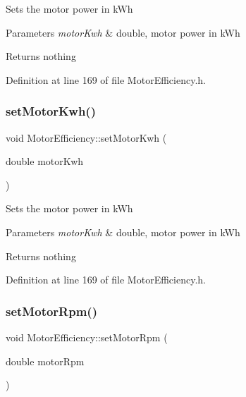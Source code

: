 Sets the motor power in k\+Wh


\begin{DoxyParams}{Parameters}
{\em motor\+Kwh} & double, motor power in k\+Wh\\
\hline
\end{DoxyParams}
\begin{DoxyReturn}{Returns}
nothing 
\end{DoxyReturn}


Definition at line 169 of file Motor\+Efficiency.\+h.

\mbox{\label{class_motor_efficiency_ab1c7507bac259565e43a6777d079148b}} 
\subsubsection{\texorpdfstring{set\+Motor\+Kwh()}{setMotorKwh()}\hspace{0.1cm}{\footnotesize\ttfamily [3/3]}}
{\footnotesize\ttfamily void Motor\+Efficiency\+::set\+Motor\+Kwh (\begin{DoxyParamCaption}\item[{double}]{motor\+Kwh }\end{DoxyParamCaption})\hspace{0.3cm}{\ttfamily [inline]}}

Sets the motor power in k\+Wh


\begin{DoxyParams}{Parameters}
{\em motor\+Kwh} & double, motor power in k\+Wh\\
\hline
\end{DoxyParams}
\begin{DoxyReturn}{Returns}
nothing 
\end{DoxyReturn}


Definition at line 169 of file Motor\+Efficiency.\+h.

\mbox{\label{class_motor_efficiency_a2c4ddf9f2f3e44c098dad91a0ddbaf21}} 
\subsubsection{\texorpdfstring{set\+Motor\+Rpm()}{setMotorRpm()}\hspace{0.1cm}{\footnotesize\ttfamily [1/3]}}
{\footnotesize\ttfamily void Motor\+Efficiency\+::set\+Motor\+Rpm (\begin{DoxyParamCaption}\item[{double}]{motor\+Rpm }\end{DoxyParamCaption})\hspace{0.3cm}{\ttfamily [inline]}}


